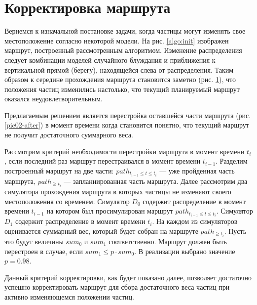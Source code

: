 \section{Корректировка маршрута}
\begin{figure}[ht]
  \centering
\begin{minipage}[t]{.4\textwidth}
  \centering
  \label{algo:init}
\end{minipage}
\begin{minipage}[t]{.4\textwidth}
  \centering
  \label{algo:before}
\end{minipage}
\end{figure}

Вернемся к изначальной постановке задачи, когда частицы могут изменять свое местоположение
согласно некоторой модели. На рис. \ref{algo:init} изображен маршрут, построенный
рассмотренным алгоритмом. Изменение распределения следует комбинации моделей случайного
блуждания и приближения к вертикальной прямой (берегу), находящейся слева от распределения.
Таким образом к середине прохождения маршрута становится заметно (рис. \ref{algo:before}), что
положения частиц изменились настолько, что текущий планируемый маршрут оказался неудовлетворительным.

Предлагаемым решением является перестройка оставшейся части маршрута (рис. \ref{pic02-after})
в момент времени когда становится понятно, что текущий маршрут не получит достаточного
суммарного веса.


Рассмотрим критерий необходимости перестройки маршрута в момент времени $t_i$, если последний
раз маршрут перестраивался в момент времени $t_{i-1}$. Разделим построенный
маршрут на две части: $path_{t_{i-1} \le t \le t_{i}}$ --- уже пройденная часть маршрута, $path_{\ge t_{i}}$
--- запланнированная часть маршрута. Далее рассмотрим два симулятора прохождения маршрута в которых
частицы не изменяют своего местоположения со временем. Симулятор $D_0$ содержит распределение
в момент времени $t_{i-1}$ на котором был просимулирован маршрут $path_{t_{i-1} \le t \le t_{i}}$.
Симулятор $D_1$ содержит распределение в момент времени $t_i$. На каждом из симуляторов оценивается
суммарный вес, который будет собран на маршруте $path_{\ge t_{i}}$. Пусть это будут величины
$sum_0$ и $sum_1$ соответственно. Маршрут должен быть перестроен в случае, если
 $sum_1 \le p \cdot sum_0$. В реализации выбрано значение $p = 0.98$.

Данный критерий корректировки, как будет показано далее, позволяет достаточно успешно корректировать
маршрут для сбора достаточного веса частиц при активно изменяющемся положении частиц.

\FloatBarrier

